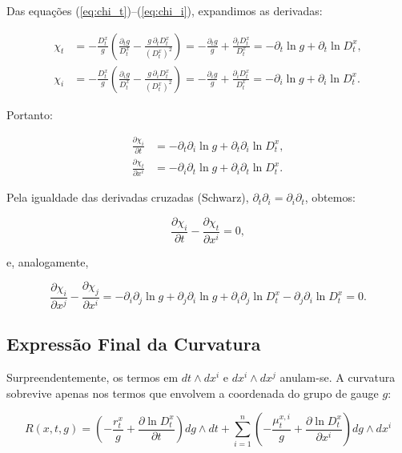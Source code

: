 Das equa\c{c}\~oes (\ref{eq:chi_t})--(\ref{eq:chi_i}), expandimos as derivadas:

\begin{align}
\chi_t &= -\frac{D_t^x}{g}\left(\frac{\partial_t g}{D_t^x} - \frac{g\,\partial_t D_t^x}{(D_t^x)^2}\right) = -\frac{\partial_t g}{g} + \frac{\partial_t D_t^x}{D_t^x} = -\partial_t \ln g + \partial_t \ln D_t^x, \\
\chi_i &= -\frac{D_t^x}{g}\left(\frac{\partial_i g}{D_t^x} - \frac{g\,\partial_i D_t^x}{(D_t^x)^2}\right) = -\frac{\partial_i g}{g} + \frac{\partial_i D_t^x}{D_t^x} = -\partial_i \ln g + \partial_i \ln D_t^x.
\end{align}

\noindent Portanto:

\begin{align}
\frac{\partial \chi_i}{\partial t} &= -\partial_t \partial_i \ln g + \partial_t \partial_i \ln D_t^x, \\
\frac{\partial \chi_t}{\partial x^i} &= -\partial_i \partial_t \ln g + \partial_i \partial_t \ln D_t^x.
\end{align}

\noindent Pela igualdade das derivadas cruzadas (Schwarz), $\partial_t \partial_i = \partial_i \partial_t$, obtemos:

\begin{equation}
\frac{\partial \chi_i}{\partial t} - \frac{\partial \chi_t}{\partial x^i} = 0,
\end{equation}

\noindent e, analogamente,

\begin{equation}
\frac{\partial \chi_i}{\partial x^j} - \frac{\partial \chi_j}{\partial x^i} = -\partial_i \partial_j \ln g + \partial_j \partial_i \ln g + \partial_i \partial_j \ln D_t^x - \partial_j \partial_i \ln D_t^x = 0.
\end{equation}

\subsection{Express\~ao Final da Curvatura}

Surpreendentemente, os termos em $dt \wedge dx^i$ e $dx^i \wedge dx^j$ anulam-se. A curvatura sobrevive apenas nos termos que envolvem a coordenada do grupo de gauge $g$:

\begin{equation}
\boxed{R(x, t, g) = \left(-\frac{r_t^x}{g} + \frac{\partial \ln D_t^x}{\partial t}\right) dg \wedge dt + \sum_{i=1}^n \left(-\frac{\mu_t^{x,i}}{g} + \frac{\partial \ln D_t^x}{\partial x^i}\right) dg \wedge dx^i}
\end{equation}

